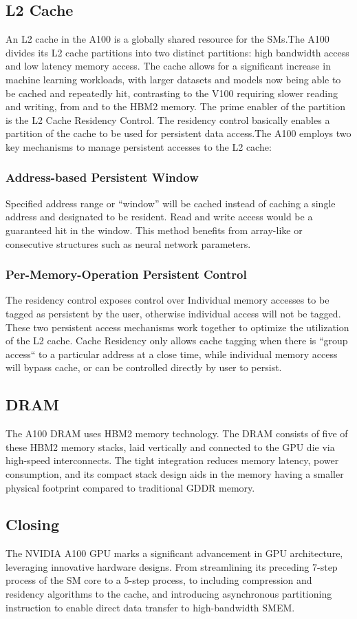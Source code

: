 \subsection{L2 Cache}
\label{subsec:l2-cache}
An L2 cache in the A100 is a globally shared resource for the SMs.The A100 divides its L2 cache partitions into two distinct partitions: high bandwidth access and low latency memory access.
The cache allows for a significant increase in machine learning workloads, with larger datasets and models now being able to be cached and repeatedly hit, contrasting to the V100 requiring slower reading and writing, from and to the HBM2 memory.
The prime enabler of the partition is the L2 Cache Residency Control.
The residency control basically enables a partition of the cache to be used for persistent data access.The A100 employs two key mechanisms to manage persistent accesses to the L2 cache:

\subsubsection{Address-based Persistent Window} Specified address range or “window” will be cached instead of caching a single address and designated to be resident.
Read and write access would be a guaranteed hit in the window.
This method benefits from array-like or consecutive structures such as neural network parameters.

\subsubsection{Per-Memory-Operation Persistent Control} The residency control exposes control over Individual memory accesses to be tagged as persistent by the user, otherwise individual access will not be tagged.
These two persistent access mechanisms work together to optimize the utilization of the L2 cache.
Cache Residency only allows cache tagging when there is ``group access`` to a particular address at a close time, while individual memory access will bypass cache, or can be controlled directly by user to persist.

\subsection{DRAM}
\label{subsec:dram}
The A100 DRAM uses HBM2 memory technology.
The DRAM consists of five of these HBM2 memory stacks, laid vertically and connected to the GPU die via high-speed interconnects.
The tight integration reduces memory latency, power consumption, and its compact stack design aids in the memory having a smaller physical footprint compared to traditional GDDR memory.

\subsection{Closing}
\label{subsec:closing}
The NVIDIA A100 GPU marks a significant advancement in GPU architecture, leveraging innovative hardware designs.
From streamlining its preceding 7-step process of the SM core to a 5-step process, to including compression and residency algorithms to the cache, and introducing asynchronous partitioning instruction to enable direct data transfer to high-bandwidth SMEM\@.
